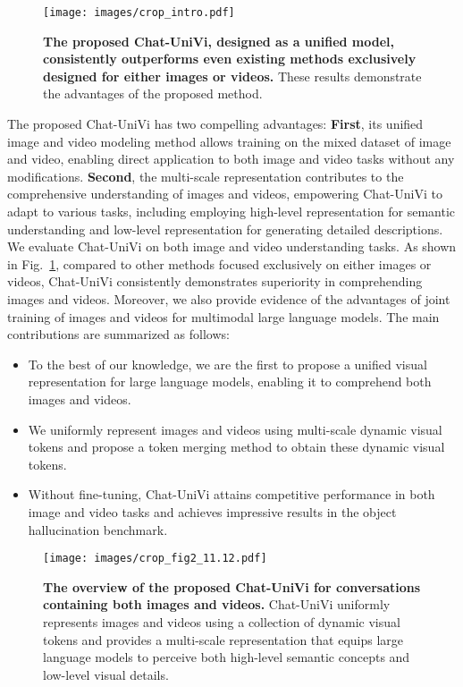 \documentclass[10pt,twocolumn,letterpaper]{article}
\begin{document}
\begin{figure}[tbp]
\centering
\texttt{[image: images/crop\_intro.pdf]}
\vspace{-1.6em}
\caption{\textbf{The proposed Chat-UniVi, designed as a unified model, consistently outperforms even existing methods exclusively designed for either images or videos.} These results demonstrate the advantages of the proposed method.}
\vspace{-.8em}
\label{fig1_1}
\end{figure}

The proposed Chat-UniVi has two compelling advantages: \textbf{First}, its unified image and video modeling method allows training on the mixed dataset of image and video, enabling direct application to both image and video tasks without any modifications. \textbf{Second}, the multi-scale representation contributes to the comprehensive understanding of images and videos, empowering Chat-UniVi to adapt to various tasks, including employing high-level representation for semantic understanding and low-level representation for generating detailed descriptions. We evaluate Chat-UniVi on both image and video understanding tasks. As shown in Fig.~\ref{fig1_1}, compared to other methods focused exclusively on either images or videos, Chat-UniVi consistently demonstrates superiority in comprehending images and videos. Moreover, we also provide evidence of the advantages of joint training of images and videos for multimodal large language models. The main contributions are summarized as follows:
\begin{itemize}
    \item To the best of our knowledge, we are the first to propose a unified visual representation for large language models, enabling it to comprehend both images and videos.
    \item We uniformly represent images and videos using multi-scale dynamic visual tokens and propose a token merging method to obtain these dynamic visual tokens. 
    \item Without fine-tuning, Chat-UniVi attains competitive performance in both image and video tasks and achieves impressive results in the object hallucination benchmark.
\end{itemize}

\begin{figure*}[tbp]
\centering
\texttt{[image: images/crop\_fig2\_11.12.pdf]}
\vspace{-1.5em}
\caption{\textbf{The overview of the proposed Chat-UniVi for conversations containing both images and videos.} Chat-UniVi uniformly represents images and videos using a collection of dynamic visual tokens and provides a multi-scale representation that equips large language models to perceive both high-level semantic concepts and low-level visual details.}
\vspace{-.8em}
\label{fig2}
\end{figure*}
\end{document}
